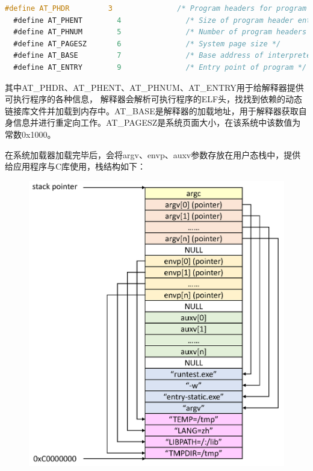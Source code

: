 \documentclass[UTF8,a4paper,10pt]{ctexart}
\begin{document}
\begin{lstlisting}[title=AUXV信息,frame=trbl,language={C}]
  #define AT_PHDR         3               /* Program headers for program */
  #define AT_PHENT        4               /* Size of program header entry */
  #define AT_PHNUM        5               /* Number of program headers */
  #define AT_PAGESZ       6               /* System page size */
  #define AT_BASE         7               /* Base address of interpreter */
  #define AT_ENTRY        9               /* Entry point of program */
  \end{lstlisting}

其中AT\_PHDR、AT\_PHENT、AT\_PHNUM、AT\_ENTRY用于给解释器提供可执行程序的各种信息，
解释器会解析可执行程序的ELF头，找找到依赖的动态链接库文件并加载到内存中。AT\_BASE是解释器的加载地址，用于解释器获取自身信息并进行重定向工作。AT\_PAGESZ是系统页面大小，在该系统中该数值为常数0x1000。

在系统加载器加载完毕后，会将argv、envp、auxv参数存放在用户态栈中，提供给应用程序与C库使用，栈结构如下：

\begin{figure}[H]
  \centering
  \includegraphics[scale=0.5]{image/loader02.png}
\end{figure}
\end{document}
